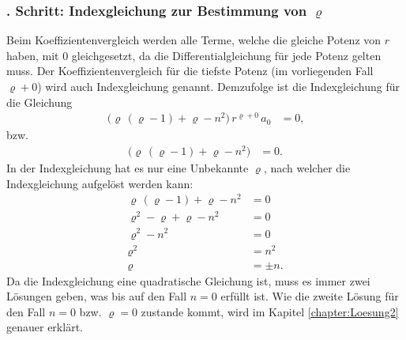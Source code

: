 \subsubsection{. Schritt: Indexgleichung zur Bestimmung von $\varrho$}
%
Beim Koeffizientenvergleich werden alle Terme,
welche die gleiche Potenz von $r$ haben,
mit $0$ gleichgesetzt,
da die Differentialgleichung f\"ur jede Potenz gelten muss.
Der Koeffizientenvergleich f\"ur die tiefste Potenz (im vorliegenden Fall $\varrho + 0$) wird auch Indexgleichung genannt.
Demzufolge ist die Indexgleichung f\"ur die Gleichung 
\begin{align}
	\big( \varrho \, \left( \varrho -1 \right) + \varrho - n^2 \big)
	\, r^{\varrho + 0} \, a_0 &= 0
	\label{eq:bessel:indexgleichung:ausgangslage}
	\text{,}
\end{align}
bzw.
\begin{align}
	\big( \varrho \, \left( \varrho -1 \right) + \varrho - n^2 \big) &= 0
	\label{eq:bessel:indexgleichung:ausgangslage:vereinfacht}
	\text{.}
\end{align}
In der Indexgleichung  hat es nur eine Unbekannte $\varrho$,
nach welcher die Indexgleichung aufgel\"ost werden kann:
\begin{align*}
	\varrho \, \left( \varrho -1 \right) + \varrho - n^2 &= 0 \\
	\varrho ^2 - \varrho + \varrho -n^2 &= 0  \\
	\varrho ^2 - n^2 &= 0 \\
	\varrho ^2 &= n^2 \\
	\varrho &= \pm n
	\text{.}
\end{align*}
Da die Indexgleichung eine quadratische Gleichung ist,
muss es immer zwei L\"osungen geben,
was bis auf den Fall $n = 0$ erf\"ullt ist.
Wie die zweite L\"osung f\"ur den Fall $n = 0$ bzw. $\varrho = 0$ zustande kommt,
wird im Kapitel \ref{chapter:Loesung2} genauer erkl\"art.
